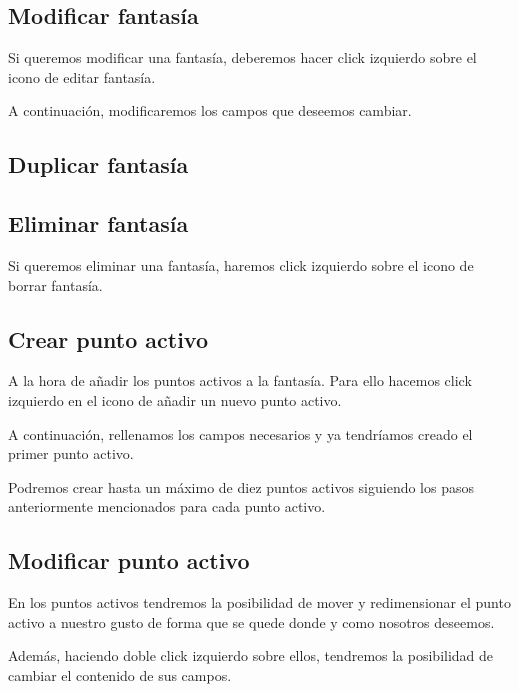 \documentclass{book}
\begin{document}
\subsection{Modificar fantasía}
Si queremos modificar una fantasía, deberemos hacer click izquierdo sobre el icono de editar fantasía.



A continuación, modificaremos los campos que deseemos cambiar.



\subsection{Duplicar fantasía}


\subsection{Eliminar fantasía}
Si queremos eliminar una fantasía, haremos click izquierdo sobre el icono de borrar fantasía.


\subsection{Crear punto activo}
A la hora de añadir los puntos activos a la fantasía. Para ello hacemos click izquierdo en el icono de añadir un nuevo punto activo.



A continuación, rellenamos los campos necesarios y ya tendríamos creado el primer punto activo.


Podremos crear hasta un máximo de diez puntos activos siguiendo los pasos anteriormente mencionados para cada punto activo.


\subsection{Modificar punto activo}
En los puntos activos tendremos la posibilidad de mover y redimensionar el punto activo a nuestro gusto de forma que se quede donde y como nosotros deseemos.

Además, haciendo doble click izquierdo sobre ellos, tendremos la posibilidad de cambiar el contenido de sus campos.
\end{document}
